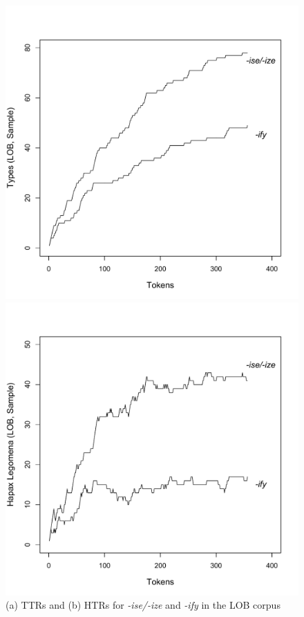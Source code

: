 \begin{figure}[p]
\caption{(a) TTRs and (b) HTRs for \textit{-ise/-ize} and \textit{-ify} in the LOB corpus\label{fig:izesamplettrhtr}}
\begin{minipage}{.5\textwidth}
 \centering
 \includegraphics[width=\textwidth,trim=0 0 0 55]{figures/lobsampleiseifytypes}
\end{minipage}%
\begin{minipage}{.5\textwidth}
 \centering
 \includegraphics[width=\textwidth,trim=0 0 0 55]{figures/lobsampleiseifyhapaxes}
\end{minipage}
\end{figure}

